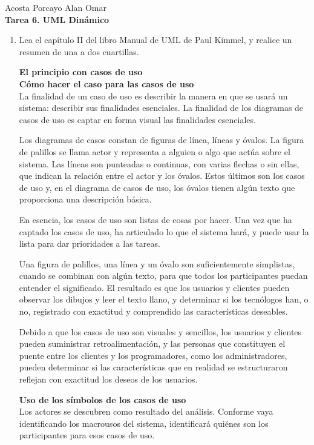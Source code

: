 \documentclass[12pt]{article}
\newcommand{\linejump}{\hfill \break}
\begin{document}
  \begin{center}
    Acosta Porcayo Alan Omar \\
    \linejump
    \LARGE \textbf{Tarea 6. UML Dinámico}
  \end{center}
  
  \linejump
  \begin{enumerate}
    \item Lea el capítulo II del libro Manual de UML de Paul Kimmel, y realice un resumen de una a dos cuartillas.
    
    \textbf{\large{El principio con casos de uso}} \\

    \textbf{Cómo hacer el caso para las casos de uso} \\
    La finalidad de un caso de uso es describir la manera en que se usará un sistema: describir sus finalidades esenciales. La finalidad de los diagramas de casos de uso es captar en forma visual las finalidades esenciales.

    Los diagramas de casos constan de figuras de línea, líneas y óvalos. La figura de palillos se llama actor y representa a alguien o algo que actúa sobre el sistema. Las líneas son punteadas o continuas, con varias flechas o sin ellas, que indican la relación entre el actor y los óvalos. Estos últimos son los casos de uso y, en el diagrama de casos de uso, los óvalos tienen algún texto que proporciona una descripción básica.

    En esencia, los casos de uso son listas de cosas por hacer. Una vez que ha captado los casos de uso, ha articulado lo que el sistema hará, y puede usar la lista para dar prioridades a las tareas.

    Una figura de palillos, una línea y un óvalo son suficientemente simplistas, cuando se combinan con algún texto, para que todos los participantes puedan entender el significado. El resultado es que los usuarios y clientes pueden observar los dibujos y leer el texto llano, y determinar si los tecnólogos han, o no, registrado con exactitud y comprendido las características deseables.

    Debido a que los casos de uso son visuales y sencillos, los usuarios y clientes pueden suministrar retroalimentación, y las personas que constituyen el puente entre los clientes y los programadores, como los administradores, pueden determinar si las características que en realidad se estructuraron reflejan con exactitud los deseos de los usuarios.

    \textbf{Uso de los símbolos de los casos de uso} \\
    Los actores se descubren como resultado del análisis. Conforme vaya identificando los macrousos del sistema, identificará quiénes son los participantes para esos casos de uso.


\end{enumerate}
\end{document}
